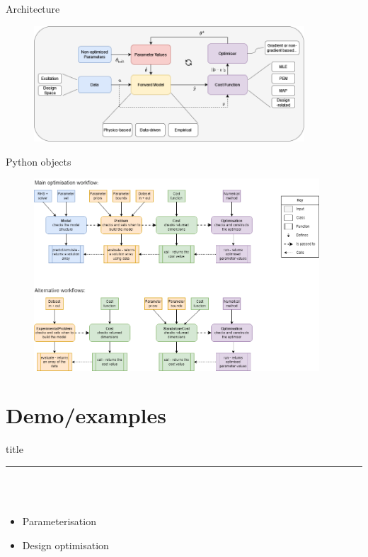 \documentclass[aspectratio=169]{beamer} %
\begin{document}
\begin{frame}{Architecture}
    \vspace{-6mm}
    \begin{figure}
        \centering
        \includegraphics[width=0.9\textwidth]{Images/pybop_architecture.png}
        \label{fig:architecture}
    \end{figure}
\end{frame}

\begin{frame}{Python objects}
    \vspace{-6mm}
    \begin{figure}
        \centering
        \includegraphics[width=0.95\textwidth, trim={0 10cm 0 0},clip]{Images/pybop_objects.png}
        \label{fig:objects}
    \end{figure}
\end{frame}


\section{Demo/examples}
\begin{frame}[plain]
    \centering
    \begin{beamercolorbox}[sep=8pt,center,shadow=true,rounded=true]{title}
    \insertsectionhead\par%
    \color{oxfordblue}\noindent\rule{10cm}{1pt} \\
    \LARGE{\faFileCodeO} \\
    \normalsize
    \begin{itemize}
        \item Parameterisation
        \item Design optimisation
    \end{itemize}
    \end{beamercolorbox}
\end{frame}
\end{document}
